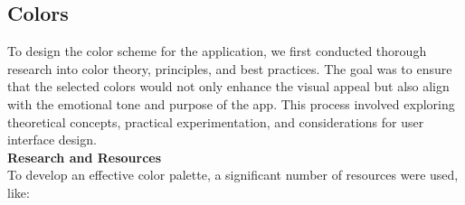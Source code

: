 \subsection{Colors}

To design the color scheme for the application, we first conducted thorough research into color theory, principles, and best practices. The goal was to ensure that the selected colors would not only enhance the visual appeal but also align with the emotional tone and purpose of the app. This process involved exploring theoretical concepts, practical experimentation, and considerations for user interface design. \\

\noindent \textbf{Research and Resources} \\
To develop an effective color palette, a significant number of resources were used, like:

